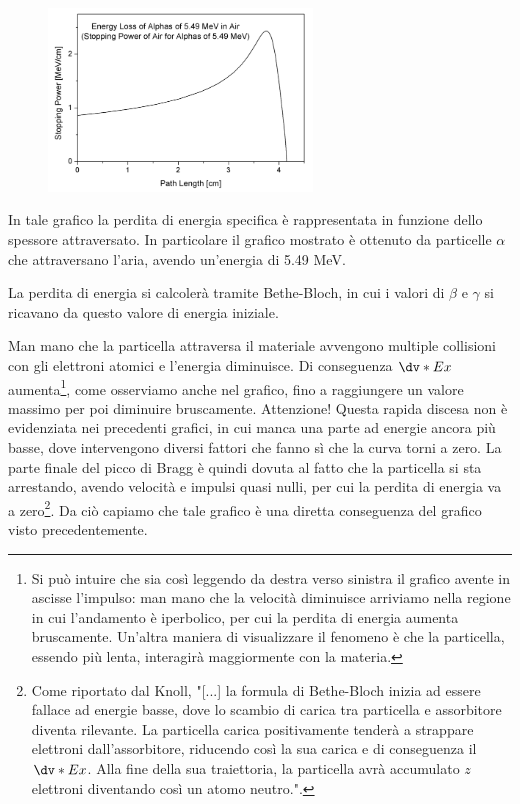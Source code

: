\begin{minipage}{0.465\textwidth}
    \begin{figure}[H]
        \centering
        \includegraphics[width=7cm]{immagini/picco_di_Bragg.png}
    \end{figure}
\end{minipage}
\begin{minipage}{0.53\textwidth}
    In tale grafico la perdita di energia specifica è rappresentata in funzione dello spessore attraversato. In particolare il grafico mostrato è ottenuto da particelle $\alpha$ che attraversano l'aria, avendo un'energia di 5.49 MeV.
    
    La perdita di energia si calcolerà tramite Bethe-Bloch, in cui i valori di $\beta$ e $\gamma$ si ricavano da questo valore di energia iniziale.
\end{minipage}

\vspace{0.4cm}Man mano che la particella attraversa il materiale avvengono multiple collisioni con gli elettroni atomici e l'energia diminuisce. Di conseguenza $\dv*{E}{x}$ aumenta\footnote{Si può intuire che sia così leggendo da destra verso sinistra il grafico avente in ascisse l'impulso: man mano che la velocità diminuisce arriviamo nella regione in cui l'andamento è iperbolico, per cui la perdita di energia aumenta bruscamente. Un'altra maniera di visualizzare il fenomeno è che la particella, essendo più lenta, interagirà maggiormente con la materia.}, come osserviamo anche nel grafico, fino a raggiungere un valore massimo per poi diminuire bruscamente. Attenzione! Questa rapida discesa non è evidenziata nei precedenti grafici, in cui manca una parte ad energie ancora più basse, dove intervengono diversi fattori che fanno sì che la curva torni a zero. La parte finale del picco di Bragg è quindi dovuta al fatto che la particella si sta arrestando, avendo velocità e impulsi quasi nulli, per cui la perdita di energia va a zero\footnote{Come riportato dal Knoll, "[...] la formula di Bethe-Bloch inizia ad essere fallace ad energie basse, dove lo scambio di carica tra particella e assorbitore diventa rilevante. La particella carica positivamente tenderà a strappare elettroni dall'assorbitore, riducendo così la sua carica e di conseguenza il $\dv*{E}{x}$. Alla fine della sua traiettoria, la particella avrà accumulato $z$ elettroni diventando così un atomo neutro.".}. Da ciò capiamo che tale grafico è una diretta conseguenza del grafico visto precedentemente.

